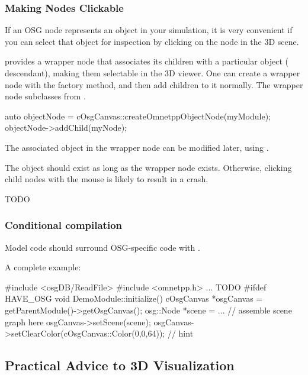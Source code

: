 \subsubsection{Making Nodes Clickable}

If an OSG node represents an object in your simulation, it is very convenient
if you can select that object for inspection by clicking on the node in the 3D scene.

{\opp} provides a wrapper node that associates its children with a particular {\opp}
object ( descendant), making them selectable in the 3D viewer.
One can create a wrapper node with the 
factory method, and then add children to it normally. The wrapper node subclasses
from .

\begin{cpp}
auto objectNode = cOsgCanvas::createOmnetppObjectNode(myModule);
objectNode->addChild(myNode);
\end{cpp}

The associated {\opp} object in the wrapper node can be modified later, using
.

\begin{note}
The {\opp} object should exist as long as the wrapper node exists. Otherwise,
clicking child nodes with the mouse is likely to result in a crash.
\end{note}

TODO

\subsubsection{Conditional compilation}

Model code should surround OSG-specific code with .

A complete example:

\begin{cpp}
#include <osgDB/ReadFile>
#include <omnetpp.h>
...
TODO #ifdef HAVE_OSG
void DemoModule::initialize()
{
    cOsgCanvas *osgCanvas = getParentModule()->getOsgCanvas();
    osg::Node *scene = ... // assemble scene graph here
    osgCanvas->setScene(scene);
    osgCanvas->setClearColor(cOsgCanvas::Color(0,0,64)); // hint
}
\end{cpp}


\subsection{Practical Advice to 3D Visualization}

